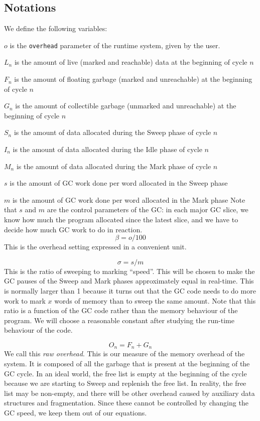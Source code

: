 \documentclass{article}
\begin{document}
\subsection{Notations}

We define the following variables:

\bigskip
$o$ is the \verb'overhead' parameter of the runtime system, given by
the user.

$L_n$ is the amount of live (marked and reachable) data at the
beginning of cycle $n$

$F_n$ is the amount of floating garbage (marked and unreachable) at
the beginning of cycle $n$

$G_n$ is the amount of collectible garbage (unmarked and unreachable)
at the beginning of cycle $n$

$S_n$ is the amount of data allocated during the Sweep phase of cycle
$n$

$I_n$ is the amount of data allocated during the Idle phase of cycle
$n$

$M_n$ is the amount of data allocated during the Mark phase of cycle
$n$

$s$ is the amount of GC work done per word allocated in the Sweep phase

$m$ is the amount of GC work done per word allocated in the Mark phase
\bigskip
Note that $s$ and $m$ are the control parameters of the GC: in each
major GC slice, we know how much the program allocated since the
latest slice, and we have to decide how much GC work to do in
reaction.
\bigskip
\begin{equation}\label{def-beta}
\beta = o/100
\end{equation}
This is the overhead setting expressed in a convenient unit.

\begin{equation}\label{def-sigma}
\sigma = s/m
\end{equation}
This is the ratio of sweeping to marking ``speed''. This
will be chosen to make the GC pauses of the Sweep and Mark phases
approximately equal in real-time. This is normally larger than 1
because it turns out that the GC code needs to do more work to mark
$x$ words of memory than to sweep the same amount. Note that this
ratio is a function of the GC code rather than the memory behaviour of
the program. We will choose a reasonable constant after studying the
run-time behaviour of the code.

\begin{equation}\label{def-O}
O_n = F_n + G_n
\end{equation}
We call this \emph{raw overhead}. This is our measure of the memory
overhead of the system. It is
composed of all the garbage that is present at the  beginning of the
GC cycle. In an ideal world, the free list is empty at the beginning
of the cycle because we are starting to Sweep and replenish the free
list. In reality, the free list may be non-empty, and there will be
other overhead caused by auxiliary data structures and
fragmentation. Since these cannot be controlled by changing the GC
speed, we keep them out of our equations.
\end{document}
